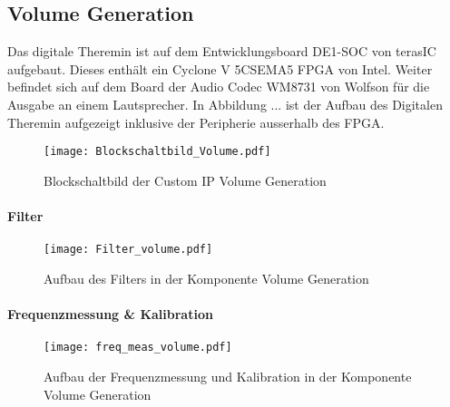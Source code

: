 \subsection{Volume Generation}\label{subsec:Volume_Generation}
Das digitale Theremin ist auf dem Entwicklungsboard DE1-SOC von terasIC aufgebaut. Dieses enthält ein Cyclone V 5CSEMA5 FPGA von Intel. Weiter befindet sich auf dem Board der Audio Codec WM8731 von Wolfson für die Ausgabe an einem Lautsprecher. In Abbildung ...  ist der Aufbau des Digitalen Theremin aufgezeigt inklusive der Peripherie ausserhalb des FPGA.



\begin{figure}[h!]
	\centering
	\texttt{[image: Blockschaltbild\_Volume.pdf]}
	\caption{Blockschaltbild der Custom IP Volume Generation} 
	\label{img:Blockschaltbild_volume}
\end{figure}  

\paragraph{Filter}

\begin{figure}[h!]
	\centering
	\texttt{[image: Filter\_volume.pdf]}
	\caption{Aufbau des Filters in der Komponente Volume Generation} 
	\label{img:Filter_Volume}
\end{figure}  

\paragraph{Frequenzmessung \& Kalibration}

\begin{figure}[h!]
	\centering
	\texttt{[image: freq\_meas\_volume.pdf]}
	\caption{Aufbau der Frequenzmessung und Kalibration in der Komponente Volume Generation} 
	\label{img:freq_meas_volume}
\end{figure}  